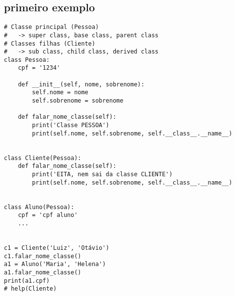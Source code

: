 \documentclass{article}
\begin{document}
\subsection{primeiro exemplo}
\begin{lstlisting}
# Classe principal (Pessoa)
#   -> super class, base class, parent class
# Classes filhas (Cliente)
#   -> sub class, child class, derived class
class Pessoa:
    cpf = '1234'

    def __init__(self, nome, sobrenome):
        self.nome = nome
        self.sobrenome = sobrenome

    def falar_nome_classe(self):
        print('Classe PESSOA')
        print(self.nome, self.sobrenome, self.__class__.__name__)


class Cliente(Pessoa):
    def falar_nome_classe(self):
        print('EITA, nem sai da classe CLIENTE')
        print(self.nome, self.sobrenome, self.__class__.__name__)


class Aluno(Pessoa):
    cpf = 'cpf aluno'
    ...


c1 = Cliente('Luiz', 'Otávio')
c1.falar_nome_classe()
a1 = Aluno('Maria', 'Helena')
a1.falar_nome_classe()
print(a1.cpf)
# help(Cliente)
    
\end{lstlisting}
\end{document}
